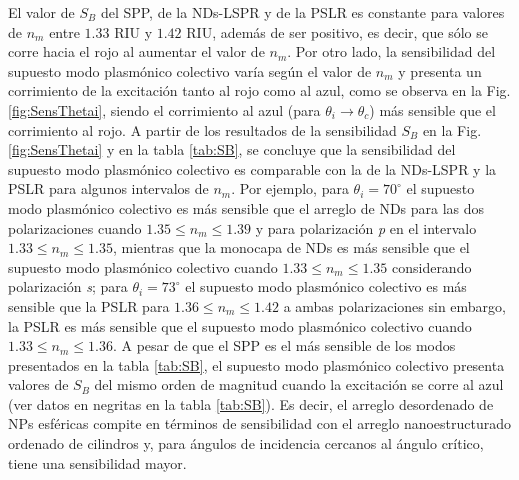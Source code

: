 El valor de $S_B$ del SPP, de la NDs-LSPR y de la PSLR es constante para valores de $n_m$ entre $1.33$ RIU y $1.42$ RIU, además de ser positivo, es decir, que sólo se corre hacia el rojo al aumentar el valor de $n_m$. Por otro lado, la sensibilidad del supuesto modo  plasmónico colectivo varía según el valor de $n_m$ y presenta un corrimiento de la excitación tanto al rojo como al azul, como se observa en la Fig. \ref{fig:SensThetai}, siendo el corrimiento al azul (para $\theta_i\to\theta_c$) más sensible que el corrimiento al rojo. A partir de los resultados de la sensibilidad $S_B$ en la Fig. \ref{fig:SensThetai} y en la tabla \ref{tab:SB}, se concluye que  la sensibilidad del supuesto modo  plasmónico colectivo es comparable con la de la NDs-LSPR y la PSLR para algunos intervalos de $n_m$. Por ejemplo, para $\theta_i = 70^\circ$ el supuesto modo  plasmónico colectivo es más sensible que el arreglo de NDs para las dos polarizaciones cuando $1.35 \leq n_m \leq 1.39$ y para polarización \emph{p} en el intervalo $1.33\leq n_m \leq 1.35$, mientras que la monocapa de NDs es más sensible que el supuesto modo  plasmónico colectivo cuando $1.33\leq n_m \leq 1.35$ considerando polarización \emph{s}; para $\theta_i=73^\circ$ el supuesto modo  plasmónico colectivo es más sensible que la PSLR para $1.36\leq n_m \leq 1.42$  a ambas polarizaciones sin embargo, la PSLR es más sensible que el supuesto modo  plasmónico colectivo cuando $1.33\leq n_m \leq 1.36$.  A pesar de que el SPP es el más sensible de los modos presentados en la tabla \ref{tab:SB}, el supuesto modo plasmónico colectivo presenta valores de $S_B$ del mismo orden de magnitud cuando la excitación se corre al azul (ver datos en negritas en la tabla \ref{tab:SB}). Es decir, el arreglo desordenado de NPs esféricas compite en términos de sensibilidad con el arreglo nanoestructurado ordenado de cilindros y, para ángulos de incidencia cercanos al ángulo crítico, tiene una sensibilidad mayor.

